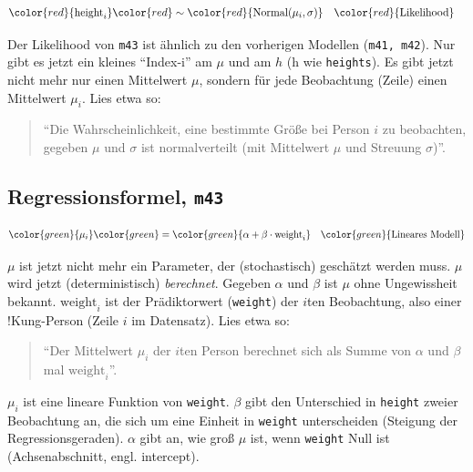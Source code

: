 \documentclass[
  a4paper,
  DIV=11]{scrreprt}
\theoremstyle{definition}
\theoremstyle{remark}
\begin{document}
\[
\begin{aligned}
\color{red}{\text{height}_i} & \color{red}\sim \color{red}{\operatorname{Normal}(\mu_i, \sigma)} && \color{red}{\text{Likelihood}}
\end{aligned}
\]

Der Likelihood von \texttt{m43} ist ähnlich zu den vorherigen Modellen
(\texttt{m41,\ m42}). Nur gibt es jetzt ein kleines ``Index-i'' am
\(\mu\) und am \(h\) (h wie \texttt{heights}). Es gibt jetzt nicht mehr
nur einen Mittelwert \(\mu\), sondern für jede Beobachtung (Zeile) einen
Mittelwert \(\mu_i\). Lies etwa so:

\begin{quote}
``Die Wahrscheinlichkeit, eine bestimmte Größe bei Person \(i\) zu
beobachten, gegeben \(\mu\) und \(\sigma\) ist normalverteilt (mit
Mittelwert \(\mu\) und Streuung \(\sigma\))''.
\end{quote}

\hypertarget{regressionsformel-m43}{%
\subsection{\texorpdfstring{Regressionsformel,
\texttt{m43}}{Regressionsformel, m43}}\label{regressionsformel-m43}}

\[
\begin{aligned}
\color{green}{\mu_i} & \color{green}= \color{green}{\alpha + \beta\cdot \text{weight}_i}  && \color{green}{\text{Lineares Modell} } \\
\end{aligned}
\]

\(\mu\) ist jetzt nicht mehr ein Parameter, der (stochastisch) geschätzt
werden muss. \(\mu\) wird jetzt (deterministisch) \emph{berechnet}.
Gegeben \(\alpha\) und \(\beta\) ist \(\mu\) ohne Ungewissheit bekannt.
\(\text{weight}_i\) ist der Prädiktorwert (\texttt{weight}) der \(i\)ten
Beobachtung, also einer !Kung-Person (Zeile \(i\) im Datensatz). Lies
etwa so:

\begin{quote}
``Der Mittelwert \(\mu_i\) der \(i\)ten Person berechnet sich als Summe
von \(\alpha\) und \(\beta\) mal \(\text{weight}_i\)''.
\end{quote}

\(\mu_i\) ist eine lineare Funktion von \texttt{weight}. \(\beta\) gibt
den Unterschied in \texttt{height} zweier Beobachtung an, die sich um
eine Einheit in \texttt{weight} unterscheiden (Steigung der
Regressionsgeraden). \(\alpha\) gibt an, wie groß \(\mu\) ist, wenn
\texttt{weight} Null ist (Achsenabschnitt, engl. intercept).
\end{document}
